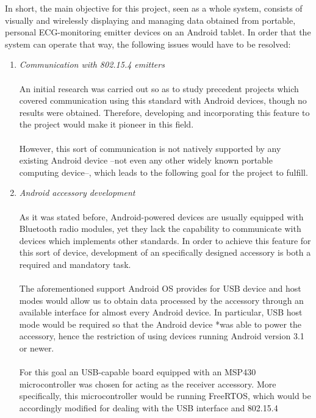 		In short, the main objective for this project, seen as a whole system, consists of
		visually and wirelessly displaying and managing data obtained from portable, personal ECG-monitoring
		emitter devices on an Android tablet. In order that the system can operate that way, the following 
		issues would have to be resolved:
		\begin{enumerate}
			\item \emph{Communication with 802.15.4 emitters}\\\\
				An initial research was carried out so as to study precedent projects which covered communication
				using this standard with Android devices, though no results were obtained. Therefore, developing
				and	incorporating this feature to the project would make it pioneer in this field.\\\\
				However, this sort of communication is not natively supported by any existing Android device
				--not even any other widely known portable computing device--, which leads to the following goal
				for the project to fulfill.\\
			\item \emph{Android accessory development}\\\\
				As it was stated before, Android-powered devices are usually equipped with Bluetooth radio
				modules, yet they lack the capability to communicate with devices which implements other 
				standards. In order to achieve this feature for this sort of device, development of an
				specifically designed accessory is both a required and mandatory task.\\\\
				The aforementioned support Android OS provides for USB device and host modes would allow us to
				obtain data processed by the accessory through an available interface for almost every 
				Android device. In particular, USB host mode would be required so that the Android device 
				*was able to power the accessory, hence the restriction of using devices running %
				Android version 3.1 or newer.\\\\
				For this goal an USB-capable board equipped with an MSP430 microcontroller was chosen for acting
				as the receiver accessory. More specifically, this microcontroller would be running FreeRTOS,
				which would be accordingly modified for dealing with the USB interface and 802.15.4 

\end{enumerate}
